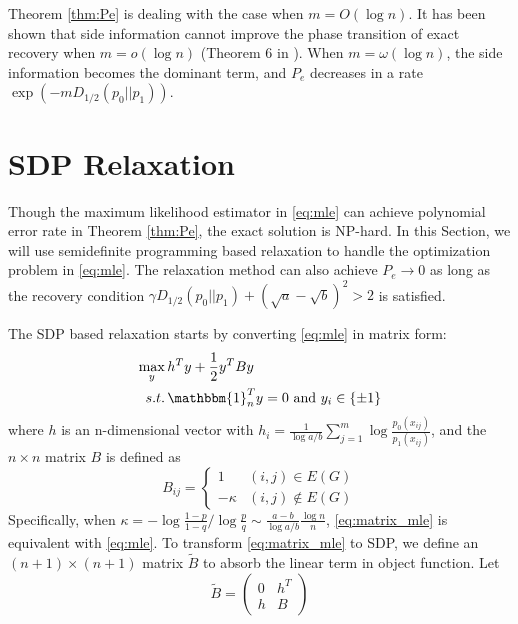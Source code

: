 \documentclass[conference]{IEEEtran}
\begin{document}
	Theorem \ref{thm:Pe} is dealing with the case when $m=O(\log n)$. It has been shown
	that side information cannot improve the phase transition of exact recovery when $m=o(\log n)$ (Theorem 6 in \cite{saad2018community}). When $m=\omega(\log n)$,
	the side information becomes the dominant term, and $P_e$ decreases in a rate $\exp(-m D_{1/2}(p_0||p_1) )$.
	
	\section{SDP Relaxation}
	Though the maximum likelihood estimator in \eqref{eq:mle} can achieve polynomial
	error rate in Theorem \ref{thm:Pe}, the exact solution is NP-hard. In this
	Section, we will use semidefinite programming based relaxation to handle
	the optimization problem in \eqref{eq:mle}. The relaxation method
	can also achieve $P_e\to 0$ as long as the recovery condition
	$\gamma D_{1/2}(p_0||p_1) + (\sqrt{a} - \sqrt{b})^2 > 2$ is satisfied.
	
	The SDP based relaxation starts by converting \eqref{eq:mle} in matrix form:
	\begin{align}
	\max_{y}\, & h^T y + \frac{1}{2}y^T B y \notag \\
	s.t.\, & \mathbbm{1}_n^T y = 0 \text{ and } y_i \in \{\pm 1 \} \label{eq:matrix_mle}
	\end{align}
	where $h$ is an n-dimensional vector with $h_i = \frac{1}{\log a/b}\sum_{j=1}^m \log \frac{p_0(x_{ij})}{p_1(x_{ij})}$, and the $n\times n $ matrix $B$ is defined as
	\begin{equation}
	B_{ij} = \begin{cases}
	1 & (i,j)\in E(G) \\
	-\kappa & (i,j) \not\in E(G)
	\end{cases}
	\end{equation}
	Specifically, when $\kappa = -\log\frac{1-p}{1-q} / \log\frac{p}{q} \sim \frac{a-b}{\log a/b}\frac{\log n}{n}$, \eqref{eq:matrix_mle} is equivalent with \eqref{eq:mle}. 
	To transform \eqref{eq:matrix_mle} to SDP, we define an $(n+1) \times (n+1)$ matrix $\widetilde{B}$
	to absorb the linear term in object function.
	Let 
	\begin{equation}
	\tilde{B} = \begin{pmatrix} 0 & h^T \\ h & B \end{pmatrix}
	\end{equation}
	
\end{document}
